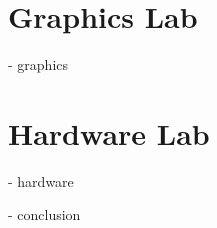 \documentclass{article}
\begin{document}
\section{Graphics Lab}
- graphics

\section{Hardware Lab}
- hardware



- conclusion





\end{document}
